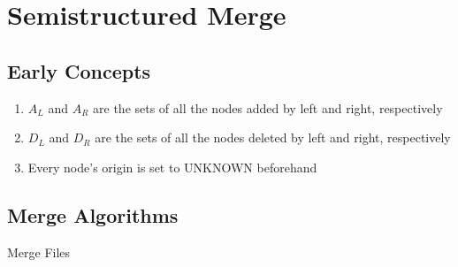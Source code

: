 \documentclass[../Algorithms.tex]{subfiles}
\begin{document}
    \section{Semistructured Merge}

    \subsection{Early Concepts}

    \begin{enumerate}
        \item $A_L$ and $A_R$ are the sets of all the nodes added by left and right, respectively
        \item $D_L$ and $D_R$ are the sets of all the nodes deleted by left and right, respectively
        \item Every node's origin is set to UNKNOWN beforehand
    \end{enumerate}

    \subsection{Merge Algorithms}

    \begin{algorithm}[H]
        \caption{Merge Files}


        \BlankLine

    \end{algorithm}

\end{document}
